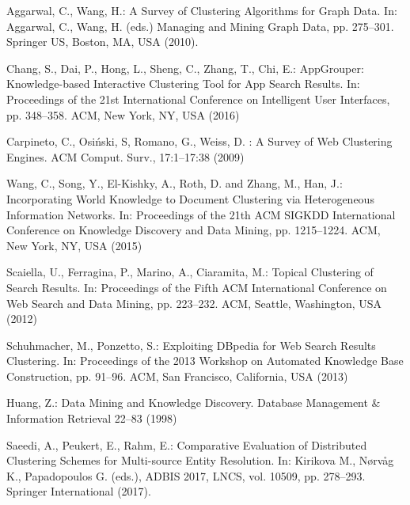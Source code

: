 \documentclass[runningheads]{llncs}
\begin{document}
\begin{thebibliography}{8}
Aggarwal, C., Wang, H.: A Survey of Clustering Algorithms for Graph Data. In: Aggarwal, C., Wang, H. (eds.) Managing and Mining Graph Data, pp. 275--301.
Springer US, Boston, MA, USA (2010). 

Chang, S., Dai, P., Hong, L., Sheng, C., Zhang, T., Chi, E.: AppGrouper: Knowledge-based Interactive Clustering Tool for App Search Results. In: Proceedings of the 21st International Conference on Intelligent User Interfaces, pp. 348--358. ACM, New York, NY, USA (2016) 

Carpineto, C., Osi\'{n}ski, S, Romano, G., Weiss, D. : A Survey of Web Clustering Engines. ACM Comput. Surv., 17:1--17:38 (2009)

Wang, C., Song, Y., El-Kishky, A., Roth, D. and Zhang, M., Han, J.: Incorporating World Knowledge to Document Clustering via Heterogeneous Information Networks. In: Proceedings of the 21th ACM SIGKDD International Conference on Knowledge Discovery and Data Mining, pp. 1215--1224. ACM, New York, NY, USA (2015)

Scaiella, U., Ferragina, P., Marino, A., Ciaramita, M.: Topical Clustering of Search Results. In: Proceedings of the Fifth ACM International Conference on Web Search and Data Mining, pp. 223--232. ACM, Seattle, Washington, USA (2012) 

Schuhmacher, M., Ponzetto, S.: Exploiting DBpedia for Web Search Results Clustering. In: Proceedings of the 2013 Workshop on Automated Knowledge Base Construction, pp. 91--96. ACM, San Francisco, California, USA (2013) 

Huang, Z.: Data Mining and Knowledge Discovery. Database Management \& Information Retrieval 22--83 (1998)  

Saeedi, A., Peukert, E., Rahm, E.: Comparative Evaluation of Distributed Clustering Schemes for Multi-source Entity Resolution. In: Kirikova M., N\o rv\aa g K., Papadopoulos G. (eds.), ADBIS 2017, LNCS, vol. 10509, pp. 278--293. Springer International (2017). 

\end{thebibliography}
\end{document}
